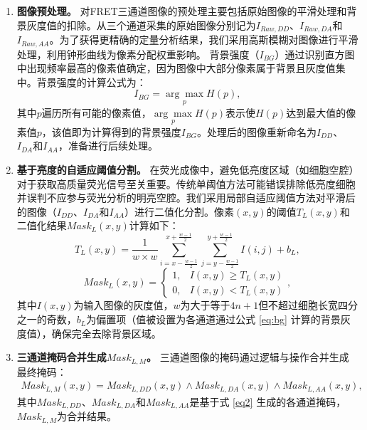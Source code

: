 \begin{enumerate}
\item \textbf{图像预处理。}  
对FRET三通道图像的预处理主要包括原始图像的平滑处理和背景灰度值的扣除。从三个通道采集的原始图像分别记为$I_{Raw,DD}$、$I_{Raw,DA}$和$I_{Raw,AA}$。为了获得更精确的定量分析结果，我们采用高斯模糊对图像进行平滑处理，利用钟形曲线为像素分配权重影响。  
背景强度（$I_{BG}$）通过识别直方图中出现频率最高的像素值确定，因为图像中大部分像素属于背景且灰度值集中。背景强度的计算公式为：
\begin{equation}
    I_{BG} = \underset{p}{\arg\max} H(p), 
    \label{eq:bg}
\end{equation}
其中$p$遍历所有可能的像素值，$\underset{p}{\arg\max} H(p)$表示使$H(p)$达到最大值的像素值$p$，该值即为计算得到的背景强度$I_{BG}$。处理后的图像重新命名为$I_{DD}$、$I_{DA}$和$I_{AA}$，准备进行后续处理。

\item \textbf{基于亮度的自适应阈值分割。}  
在荧光成像中，避免低亮度区域（如细胞空腔）对于获取高质量荧光信号至关重要。传统单阈值方法可能错误排除低亮度细胞并误判不应参与荧光分析的明亮空腔。我们采用局部自适应阈值方法对平滑后的图像（$I_{DD}$、$I_{DA}$和$I_{AA}$）进行二值化分割。像素$(x, y)$的阈值$T_L(x,y)$和二值化结果${Mask}_L(x,y)$计算如下：
\begin{equation}
    T_L(x,y)=\frac{1}{w \times w} \sum_{i=x-\frac{w-1}{2}}^{x+\frac{w-1}{2}} \sum_{j=y-\frac{w-1}{2}}^{y+\frac{w-1}{2}} I(i,j)+b_L,
    \label{eq1}
\end{equation}
\begin{equation}
    {Mask}_L(x,y)=\begin{cases}
        1,&I(x,y) \geq T_L(x,y) \\
        0,&I(x,y) < T_L(x,y)
    \end{cases},
    \label{eq2}
\end{equation}
其中$I(x,y)$为输入图像的灰度值，$w$为大于等于$4n+1$但不超过细胞长宽四分之一的奇数，$b_L$为偏置项（值被设置为各通道通过公式 \ref{eq:bg} 计算的背景灰度值），确保完全去除背景区域。

\item \textbf{三通道掩码合并生成${Mask}_{L, M}$。}  
三通道图像的掩码通过逻辑与操作合并生成最终掩码：
\begin{equation}
    \begin{split}
    {Mask}_{L, M}(x,y)={Mask}_{L, DD}(x,y) \land {Mask}_{L, DA}(x,y) \land {Mask}_{L, AA}(x,y),
    \end{split}
    \label{eq3}
\end{equation}
其中${Mask}_{L, DD}$、${Mask}_{L, DA}$和${Mask}_{L, AA}$是基于式 \ref{eq2} 生成的各通道掩码，${Mask}_{L, M}$为合并结果。


\end{enumerate}
